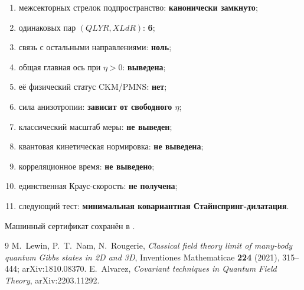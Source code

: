 \begin{protocol}
\begin{enumerate}
 \item межсекторных стрелок подпространство: \textbf{канонически замкнуто};
 \item одинаковых пар $(QLYR,XLdR)$: \textbf{6};
 \item связь с остальными направлениями: \textbf{ноль};
 \item общая главная ось при $\eta>0$: \textbf{выведена};
 \item её физический статус CKM/PMNS: \textbf{нет};
 \item сила анизотропии: \textbf{зависит от свободного $\eta$};
 \item классический масштаб меры: \textbf{не выведен};
 \item квантовая кинетическая нормировка: \textbf{не выведена};
 \item корреляционное время: \textbf{не выведено};
 \item единственная Краус-скорость: \textbf{не получена};
 \item следующий тест: \textbf{минимальная ковариантная Стайнспринг-дилатация}.
\end{enumerate}
\end{protocol}

Машинный сертификат сохранён в
.

\begin{thebibliography}{9}
M.~Lewin, P.~T.~Nam, N.~Rougerie,
\emph{Classical field theory limit of many-body quantum Gibbs states in 2D
and 3D}, Inventiones Mathematicae \textbf{224} (2021), 315--444;
arXiv:1810.08370.
E.~Alvarez,
\emph{Covariant techniques in Quantum Field Theory},
arXiv:2203.11292.
\end{thebibliography}